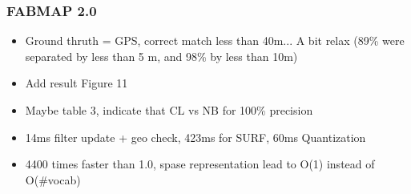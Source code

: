 \begin{frame}
    \frametitle{FABMAP 2.0}
    \begin{itemize}
        \item Ground thruth = GPS, correct match less than 40m... A bit relax (89\% were separated by less than 5 m, and 98\% by less than 10m)
        \item Add result Figure 11
        \item Maybe table 3, indicate that CL vs NB for 100\% precision
        \item 14ms filter update + geo check, 423ms for SURF, 60ms Quantization
        \item 4400 times faster than 1.0, spase representation lead to O(1) instead of O(\#vocab)
    \end{itemize}
\end{frame}


